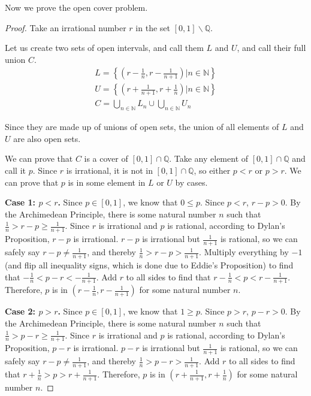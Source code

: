 \documentclass[11pt]{article}
\begin{document}
        Now we prove the open cover problem.
        \begin{proof}
            Take an irrational number $r$ in the set $[0,1] \backslash \mathbb{Q}$. 

            Let us create two sets of open intervals, and call them $L$ and $U$, and call their full union $C$.
            \begin{gather}
                L = \left\{ \left( r - \frac{1}{n}, r - \frac{1}{n + 1} \right) \Big| n \in \mathbb{N} \right\}\\
                U = \left\{ \left( r + \frac{1}{n + 1}, r + \frac{1}{n} \right) \Big| n \in \mathbb{N} \right\}\\
                C = \bigcup_{n \in \mathbb{N}} L_n \cup \bigcup_{n \in \mathbb{N}} U_n
            \end{gather}

            Since they are made up of unions of open sets, the union of all elements of $L$ and $U$ are also open sets.

            We can prove that $C$ is a cover of $[0,1] \cap \mathbb{Q}$.
            Take any element of $[0,1] \cap \mathbb{Q}$ and call it $p$.
            Since $r$ is irrational, it is not in $[0,1] \cap \mathbb{Q}$, so either $p < r$ or $p > r$.
            We can prove that $p$ is in some element in $L$ or $U$ by cases.

            \textbf{Case 1: $p < r$.}
                Since $p \in [0,1]$, we know that $0 \leq p$.
                Since $p < r$, $r - p > 0$.
                By the Archimedean Principle, there is some natural number $n$ such that $\frac{1}{n} > r - p \geq \frac{1}{n + 1}$.
                Since $r$ is irrational and $p$ is rational, according to Dylan's Proposition, $r - p$ is irrational.
                $r - p$ is irrational but $\frac{1}{n + 1}$ is rational, so we can safely say $r - p \neq \frac{1}{n + 1}$, and thereby $\frac{1}{n} > r - p > \frac{1}{n + 1}$.
                Multiply everything by $-1$ (and flip all inequality signs, which is done due to Eddie's Proposition) to find that $-\frac{1}{n} < p - r < -\frac{1}{n + 1}$.
                Add $r$ to all sides to find that $r - \frac{1}{n} < p < r - \frac{1}{n + 1}$.
                Therefore, $p$ is in $\left( r - \frac{1}{n}, r - \frac{1}{n + 1} \right)$ for some natural number $n$.

            \textbf{Case 2: $p > r$.}
                Since $p \in [0,1]$, we know that $1 \geq p$.
                Since $p > r$, $p - r > 0$.
                By the Archimedean Principle, there is some natural number $n$ such that $\frac{1}{n} > p - r \geq \frac{1}{n + 1}$.
                Since $r$ is irrational and $p$ is rational, according to Dylan's Proposition, $p - r$ is irrational.
                $p - r$ is irrational but $\frac{1}{n + 1}$ is rational, so we can safely say $r - p \neq \frac{1}{n + 1}$, and thereby $\frac{1}{n} > p - r > \frac{1}{n + 1}$.
                Add $r$ to all sides to find that $r + \frac{1}{n} > p > r + \frac{1}{n + 1}$.
                Therefore, $p$ is in $\left( r + \frac{1}{n + 1}, r + \frac{1}{n} \right)$ for some natural number $n$.


\end{proof}
\end{document}
